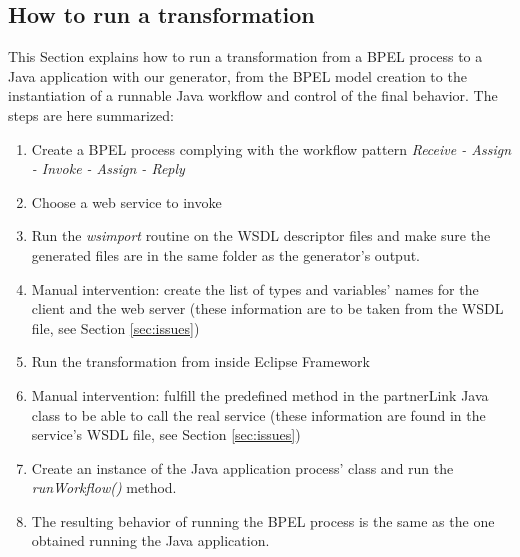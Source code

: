 \subsection{How to run a transformation}
\label{sec:HowToRun}
This Section explains how to run a transformation from a BPEL process to a Java application with our generator, from the BPEL model creation to the instantiation of a runnable Java workflow and control of the final behavior.
The steps are here summarized:
\begin{enumerate}
 \item Create a BPEL process complying with the workflow pattern \textit{Receive - Assign - Invoke - Assign - Reply}
 \item Choose a web service to invoke
 \item Run the \textit{wsimport} routine on the WSDL descriptor files and make sure the generated files are in the same folder as the generator's output.
 \item Manual intervention: create the list of types and variables' names for the client and the web server (these information are to be taken from the WSDL file, see Section \ref{sec:issues})
 \item Run the transformation from inside Eclipse Framework
 \item Manual intervention: fulfill the predefined method in the partnerLink Java class to be able to call the real service (these information are found in the service's WSDL file, see Section \ref{sec:issues})
 \item Create an instance of the Java application process' class and run the \textit{runWorkflow()} method.
 \item The resulting behavior of running the BPEL process is the same as the one obtained running the Java application.
\end{enumerate}







